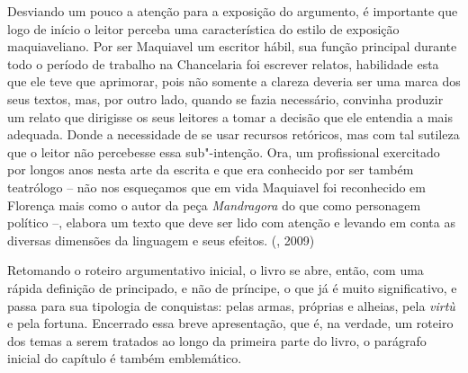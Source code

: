 Desviando um pouco a atenção para a exposição do argumento, é importante
que logo de início o leitor perceba uma característica do estilo de
exposição maquiaveliano. Por ser Maquiavel um escritor hábil, sua função
principal durante todo o período de trabalho na Chancelaria foi escrever
relatos, habilidade esta que ele teve que aprimorar, pois não somente a
clareza deveria ser uma marca dos seus textos, mas, por outro lado,
quando se fazia necessário, convinha produzir um relato que dirigisse os
seus leitores a tomar a decisão que ele entendia a mais adequada. Donde
a necessidade de se usar recursos retóricos, mas com tal sutileza que o
leitor não percebesse essa sub"-intenção. Ora, um profissional exercitado
por longos anos nesta arte da escrita e que era conhecido por ser também
teatrólogo -- não nos esqueçamos que em vida Maquiavel foi reconhecido
em Florença mais como o autor da peça \emph{Mandragora} do que como
personagem político --, elabora um texto que deve ser lido com atenção e
levando em conta as diversas dimensões da linguagem e seus efeitos.
(, 2009)

Retomando o roteiro argumentativo inicial, o livro se abre, então, com
uma rápida definição de principado, e não de príncipe, o que já é muito
significativo, e passa para sua tipologia de conquistas: pelas armas,
próprias e alheias, pela \emph{virtù} e pela fortuna. Encerrado essa
breve apresentação, que é, na verdade, um roteiro dos temas a serem
tratados ao longo da primeira parte do livro, o parágrafo inicial do
capítulo  é também emblemático.

